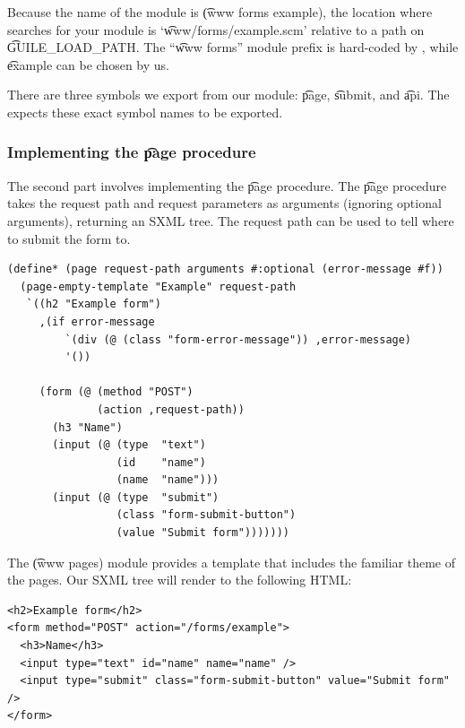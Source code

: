   Because the name of the module is \t{(www forms example)}, the location
  where  searches for your module is `\t{www/forms/example.scm}'
  relative to a path on \t{GUILE\_LOAD\_PATH}.  The ``\t{www forms}'' module
  prefix is hard-coded by , while \t{example} can be chosen by
  us.

  There are three symbols we export from our module: \t{page}, \t{submit}, and
  \t{api}.  The  expects these exact symbol names to be
  exported.

\subsubsection{Implementing the \t{page} procedure}

  The second part involves implementing the \t{page} procedure. The \t{page}
  procedure takes the request path and request parameters as arguments
  (ignoring optional arguments), returning an SXML tree.  The request path
  can be used to tell where to submit the form to.

\begin{siderules}
\begin{verbatim}
(define* (page request-path arguments #:optional (error-message #f))
  (page-empty-template "Example" request-path
   `((h2 "Example form")
     ,(if error-message
         `(div (@ (class "form-error-message")) ,error-message)
         '())

     (form (@ (method "POST")
              (action ,request-path))
       (h3 "Name")
       (input (@ (type  "text")
                 (id    "name")
                 (name  "name")))
       (input (@ (type  "submit")
                 (class "form-submit-button")
                 (value "Submit form")))))))
\end{verbatim}
\end{siderules}

  The \t{(www pages)} module provides a template that includes the familiar
  theme of the  pages.  Our SXML tree will render to the
  following HTML:

\begin{siderules}
\begin{verbatim}
<h2>Example form</h2>
<form method="POST" action="/forms/example">
  <h3>Name</h3>
  <input type="text" id="name" name="name" />
  <input type="submit" class="form-submit-button" value="Submit form" />
</form>
\end{verbatim}
\end{siderules}

